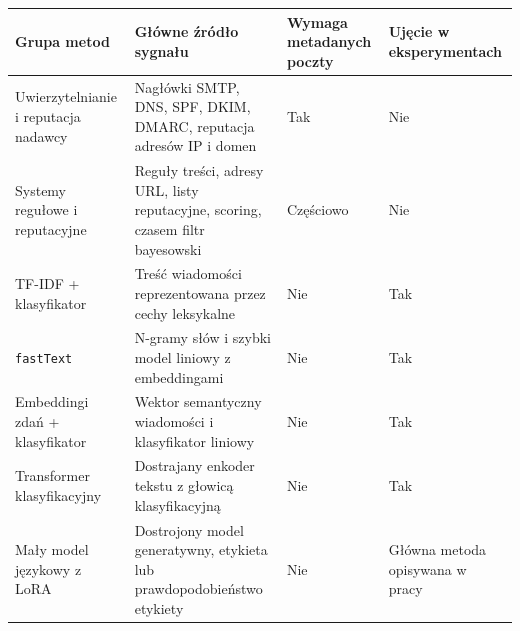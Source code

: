 \begin{tabular}{p{}p{}p{}p{}}
\hline
\textbf{Grupa metod} & \textbf{Główne źródło sygnału} & \textbf{Wymaga metadanych poczty} & \textbf{Ujęcie w eksperymentach} \\
\hline
Uwierzytelnianie i reputacja nadawcy & Nagłówki SMTP, DNS, SPF, DKIM, DMARC, reputacja adresów IP i domen & Tak & Nie \\
Systemy regułowe i reputacyjne & Reguły treści, adresy URL, listy reputacyjne, scoring, czasem filtr bayesowski & Częściowo & Nie \\
TF-IDF + klasyfikator & Treść wiadomości reprezentowana przez cechy leksykalne & Nie & Tak \\
\texttt{fastText} & N-gramy słów i szybki model liniowy z embeddingami & Nie & Tak \\
Embeddingi zdań + klasyfikator & Wektor semantyczny wiadomości i klasyfikator liniowy & Nie & Tak \\
Transformer klasyfikacyjny & Dostrajany enkoder tekstu z głowicą klasyfikacyjną & Nie & Tak \\
Mały model językowy z LoRA & Dostrojony model generatywny, etykieta lub prawdopodobieństwo etykiety & Nie & Główna metoda opisywana w pracy \\
\hline
\end{tabular}
